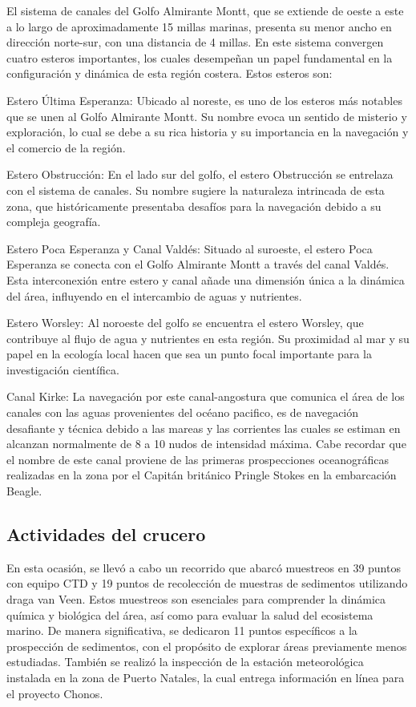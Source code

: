 \documentclass[
  letterpaper,
  DIV=11,
  numbers=noendperiod]{scrartcl}
\begin{document}
El sistema de canales del Golfo Almirante Montt, que se extiende de
oeste a este a lo largo de aproximadamente 15 millas marinas, presenta
su menor ancho en dirección norte-sur, con una distancia de 4 millas. En
este sistema convergen cuatro esteros importantes, los cuales desempeñan
un papel fundamental en la configuración y dinámica de esta región
costera. Estos esteros son:

Estero Última Esperanza: Ubicado al noreste, es uno de los esteros más
notables que se unen al Golfo Almirante Montt. Su nombre evoca un
sentido de misterio y exploración, lo cual se debe a su rica historia y
su importancia en la navegación y el comercio de la región.

Estero Obstrucción: En el lado sur del golfo, el estero Obstrucción se
entrelaza con el sistema de canales. Su nombre sugiere la naturaleza
intrincada de esta zona, que históricamente presentaba desafíos para la
navegación debido a su compleja geografía.

Estero Poca Esperanza y Canal Valdés: Situado al suroeste, el estero
Poca Esperanza se conecta con el Golfo Almirante Montt a través del
canal Valdés. Esta interconexión entre estero y canal añade una
dimensión única a la dinámica del área, influyendo en el intercambio de
aguas y nutrientes.

Estero Worsley: Al noroeste del golfo se encuentra el estero Worsley,
que contribuye al flujo de agua y nutrientes en esta región. Su
proximidad al mar y su papel en la ecología local hacen que sea un punto
focal importante para la investigación científica.

Canal Kirke: La navegación por este canal-angostura que comunica el área
de los canales con las aguas provenientes del océano pacifico, es de
navegación desafiante y técnica debido a las mareas y las corrientes las
cuales se estiman en alcanzan normalmente de 8 a 10 nudos de intensidad
máxima. Cabe recordar que el nombre de este canal proviene de las
primeras prospecciones oceanográficas realizadas en la zona por el
Capitán británico Pringle Stokes en la embarcación Beagle.

\hypertarget{actividades-del-crucero}{%
\subsection{Actividades del crucero}\label{actividades-del-crucero}}

En esta ocasión, se llevó a cabo un recorrido que abarcó muestreos en 39
puntos con equipo CTD y 19 puntos de recolección de muestras de
sedimentos utilizando draga van Veen. Estos muestreos son esenciales
para comprender la dinámica química y biológica del área, así como para
evaluar la salud del ecosistema marino. De manera significativa, se
dedicaron 11 puntos específicos a la prospección de sedimentos, con el
propósito de explorar áreas previamente menos estudiadas. También se
realizó la inspección de la estación meteorológica instalada en la zona
de Puerto Natales, la cual entrega información en línea para el proyecto
Chonos.
\end{document}
